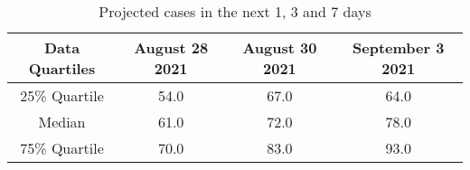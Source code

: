 
\begin{table}[h] 
 \centering 
 \begin{tabular}{c|c|c|c}
Data Quartiles & August 28 2021 & August 30 2021 & September 3 2021\\
\hline
25\% Quartile & 54.0 & 67.0 & 64.0\\
Median & 61.0 & 72.0 & 78.0\\
75\% Quartile & 70.0 & 83.0 & 93.0\\
\end{tabular}
\caption{Projected cases in the next 1, 3 and 7 days}
\label{tab:BP_predicted_cases}
\end{table}
